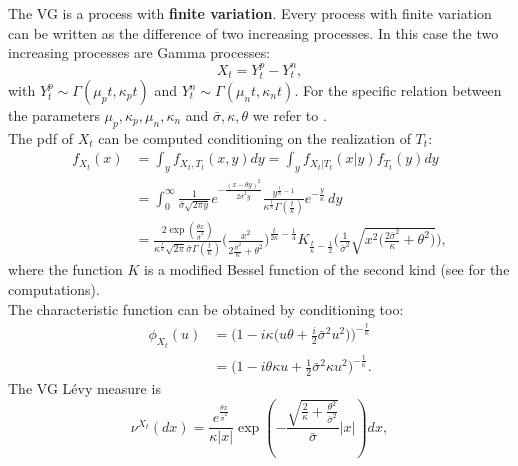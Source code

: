 The VG is a process with \textbf{finite variation}. Every process with finite variation can be written as the difference of two increasing 
processes. In this case the two increasing processes are Gamma processes:
\begin{equation}
 X_t = Y^p_t - Y^n_t,
\end{equation}
with $Y^p_t \sim \Gamma(\mu_p t, \kappa_p t)$ and $Y^n_t \sim \Gamma(\mu_n t, \kappa_n t)$. For the specific relation between the parameters
$\mu_p,\kappa_p,\mu_n,\kappa_n$ and $\bar\sigma,\kappa,\theta$ we refer to \cite{MCC98}.\\
\newline
The pdf of $X_t$ can be computed conditioning on the realization of $T_t$:
\begin{align}\label{VG_density}
 f_{X_t}(x) &= \int_y f_{X_t,T_t}(x,y) dy = \int_y f_{X_t|T_t}(x|y) f_{T_t}(y) dy \\ \nonumber
         &= \int_0^{\infty} \frac{1}{\bar\sigma \sqrt{2\pi y}} e^{-\frac{(x -\theta y)^2}{2\bar\sigma^2 y}}
         \frac{y^{\frac{t}{\kappa} -1}}{\kappa^{\frac{t}{\kappa}} \Gamma(\frac{t}{\kappa})}
          e^{-\frac{y}{\kappa}} \, dy \\ \nonumber
         &= \frac{2 \exp(\frac{\theta x}{\bar\sigma^2})}{\kappa^{\frac{t}{\kappa}} \sqrt{2\pi}\bar\sigma \Gamma(\frac{t}{\kappa}) }
            \biggl( \frac{x^2}{2\frac{\bar\sigma^2}{\kappa} + \theta^2} \biggr)^{\frac{t}{2\kappa}-\frac{1}{4}} 
            K_{\frac{t}{\kappa}-\frac{1}{2}} 
            \biggl( \frac{1}{\bar\sigma^2} \sqrt{x^2 \bigl(\frac{2\bar\sigma^2}{\kappa}+\theta^2 \bigr)} \biggr),
\end{align}
where the function $K$ is a modified Bessel function of the second kind (see \cite{MCC98} for the computations).\\
The characteristic function can be obtained by conditioning too: 
\begin{align*}
 \phi_{X_t}(u) &= \biggl( 1-i \kappa \bigl( u\theta +\frac{i}{2}\bar\sigma^2 u^2 \bigr) \biggr)^{-\frac{t}{\kappa}} \\  
	       &= \biggl( 1-i\theta \kappa u + \frac{1}{2} \bar\sigma^2 \kappa u^2 \biggr)^{-\frac{t}{\kappa}}.
\end{align*}
\newline
The VG Lévy measure is
\begin{equation}\label{VG_measure}
 \nu^{X_t}(dx) = \frac{e^{\frac{\theta x}{\bar\sigma^2}}}{\kappa|x|} \exp 
 \left( - \frac{\sqrt{\frac{2}{\kappa} + \frac{\theta^2}{\bar\sigma^2}}}{\bar\sigma} |x|\right) dx,
\end{equation}
